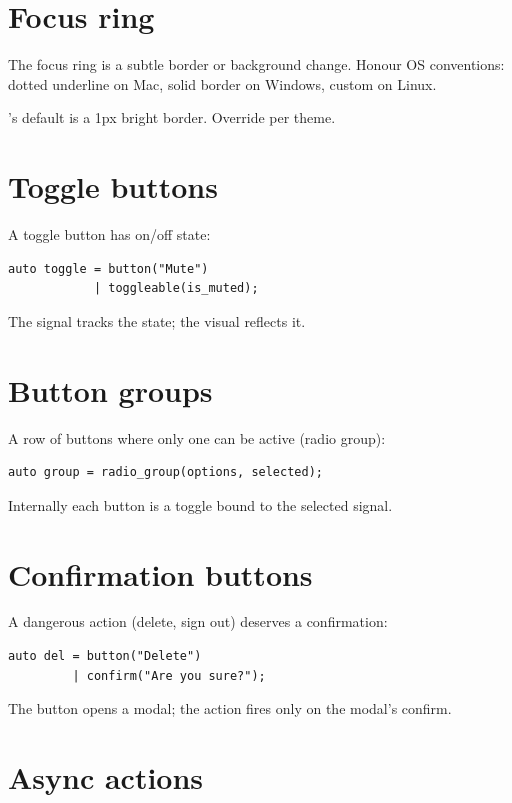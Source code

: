 \section{Focus ring}

The focus ring is a subtle border or background change.
Honour OS conventions: dotted underline on Mac, solid
border on Windows, custom on Linux.

\maya{}'s default is a 1px bright border. Override per
theme.

\section{Toggle buttons}

A toggle button has on/off state:

\begin{lstlisting}
auto toggle = button("Mute")
            | toggleable(is_muted);
\end{lstlisting}

The signal tracks the state; the visual reflects it.

\section{Button groups}

A row of buttons where only one can be active (radio
group):

\begin{lstlisting}
auto group = radio_group(options, selected);
\end{lstlisting}

Internally each button is a toggle bound to the selected
signal.

\section{Confirmation buttons}

A dangerous action (delete, sign out) deserves a
confirmation:

\begin{lstlisting}
auto del = button("Delete")
         | confirm("Are you sure?");
\end{lstlisting}

The button opens a modal; the action fires only on the
modal's confirm.

\section{Async actions}


